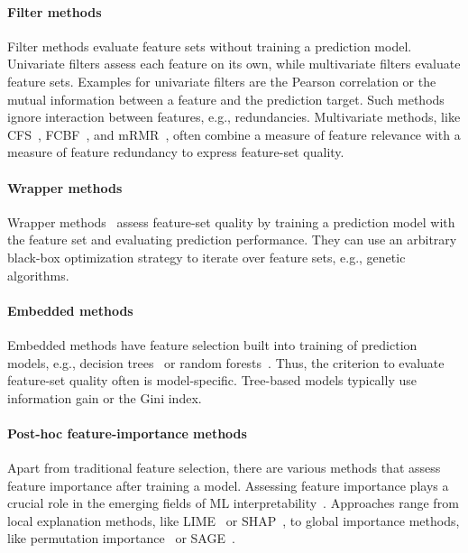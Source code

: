 \documentclass[conference]{IEEEtran}
\theoremstyle{definition}
\begin{document}
\paragraph{Filter methods}

Filter methods evaluate feature sets without training a prediction model.
Univariate filters assess each feature on its own, while multivariate filters evaluate feature sets.
Examples for univariate filters are the Pearson correlation or the mutual information between a feature and the prediction target.
Such methods ignore interaction between features, e.g., redundancies.
Multivariate methods, like CFS~\cite{hall1999correlation}, FCBF~\cite{yu2003feature}, and mRMR~\cite{peng2005feature}, often combine a measure of feature relevance with a measure of feature redundancy to express feature-set quality.

\paragraph{Wrapper methods}

Wrapper methods~\cite{kohavi1997wrappers} assess feature-set quality by training a prediction model with the feature set and evaluating prediction performance.
They can use an arbitrary black-box optimization strategy to iterate over feature sets, e.g., genetic algorithms.

\paragraph{Embedded methods}

Embedded methods have feature selection built into training of prediction models, e.g., decision trees~\cite{breiman1984classification} or random forests~\cite{breiman2001random}.
Thus, the criterion to evaluate feature-set quality often is model-specific.
Tree-based models typically use information gain or the Gini index.

\paragraph{Post-hoc feature-importance methods}

Apart from traditional feature selection, there are various methods that assess feature importance after training a model.
Assessing feature importance plays a crucial role in the emerging fields of ML interpretability~\cite{carvalho2019machine}.
Approaches range from local explanation methods, like LIME~\cite{ribeiro2016should} or SHAP~\cite{lundberg2017unified}, to global importance methods, like permutation importance~\cite{breiman2001random} or SAGE~\cite{covert2020understanding}.
\end{document}

